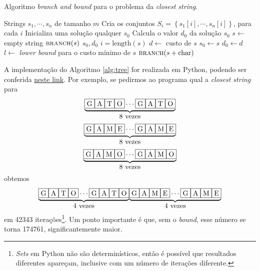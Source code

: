 \begin{algorithm}[H]
    \caption{Algoritmo \textit{branch and bound} para o problema da \textit{closest string}.}
    \label{alg:tree}
    \begin{algorithmic}
        \Require Strings $s_1, \cdots, s_n$ de tamanho $m$
        \State Cria os conjuntos $S_i = \left\{s_1[i], \cdots, s_n[i]\right\}$, para cada $i$
        \State Inicializa uma solução qualquer $s_0$
        \State Calcula o valor $d_0$ da solução $s_0$
        \State $s \gets$ empty string
        \State $\textsc{branch}(s)$        
        \State \Return $s_0, d_0$
        \State
            \State $i = \text{length}(s)$
                \State $d \gets$ custo de $s$
                    \State $s_0 \gets s$
                    \State $d_0 \gets d$
                \EndIf
                \State \Return
            \EndIf
            \State $l \gets$ \textit{lower bound} para o custo mínimo de $s$ 
                \State \Return
            \EndIf
                \State $\textsc{branch}(s + \text{char})$ 
            \EndFor
        \EndProcedure
    \end{algorithmic}
\end{algorithm}

A implementação do Algoritmo \ref{alg:tree} for realizada em Python, podendo ser conferida \href{https://github.com/lucasresck/data-structures-algorithms/blob/main/intractable_problems/scripts/closest_string_tree.py}{neste link}. Por exemplo, se pedirmos ao programa qual a \textit{closest string} para 
\[\overset{\underbrace{\text{\fbox{G}\fbox{A}\fbox{T}\fbox{O}}\cdots\text{\fbox{G}\fbox{A}\fbox{T}\fbox{O}}}}{\text{8 vezes}}\]
\[\overset{\underbrace{\text{\fbox{G}\fbox{A}\fbox{M}\fbox{E}}\cdots\text{\fbox{G}\fbox{A}\fbox{M}\fbox{E}}}}{\text{8 vezes}}\]
\[\overset{\underbrace{\text{\fbox{G}\fbox{A}\fbox{M}\fbox{O}}\cdots\text{\fbox{G}\fbox{A}\fbox{M}\fbox{O}}}}{\text{8 vezes}}\]
obtemos 
\[\overset{\underbrace{\text{\fbox{G}\fbox{A}\fbox{T}\fbox{O}}\cdots\text{\fbox{G}\fbox{A}\fbox{T}\fbox{O}}}}{\text{4 vezes}}\overset{\underbrace{\text{\fbox{G}\fbox{A}\fbox{M}\fbox{E}}\cdots\text{\fbox{G}\fbox{A}\fbox{M}\fbox{E}}}}{\text{4 vezes}}\] em 42343 iterações\footnote{\textit{Sets} em Python não são determinísticos, então é possível que resultados diferentes apareçam, inclusive com um número de iterações diferente.}. Um ponto importante é que, sem o \textit{bound}, esse número se torna 174761, significantemente maior.


